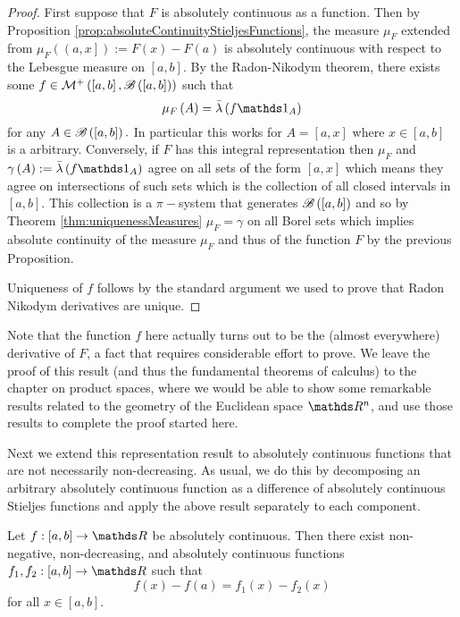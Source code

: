 \begin{proof}
First suppose that $F$ is absolutely continuous as a function. Then
by Proposition \ref{prop:absoluteContinuityStieljesFunctions}, the
measure $\mu_{F}$ extended from $\mu_{F}\left(\left(a,x\right]\right):=F\left(x\right)-F\left(a\right)$
is absolutely continuous with respect to the Lebesgue measure on $\left[a,b\right].$
By the Radon-Nikodym theorem, there exists some $f\in\mathcal{M}^{+}\left(\left[a,b\right],\mathscr{B}\left(\left[a,b\right]\right)\right)$
such that
\[
\mu_{F}\left(A\right)=\lebInt{\lambda}{f\indicate_{A}}
\]
for any $A\in\mathscr{B}\left(\left[a,b\right]\right).$ In particular
this works for $A=\left[a,x\right]$ where $x\in\left[a,b\right]$
is a arbitrary. Conversely, if $F$ has this integral representation
then $\mu_{F}$ and $\gamma\left(A\right):=\lebInt{\lambda}{f\indicate_{A}}$
agree on all sets of the form $\left[a,x\right]$ which means they
agree on intersections of such sets which is the collection of all
closed intervals in $\left[a,b\right].$ This collection is a $\pi-$system
that generates $\mathscr{B}\left(\left[a,b\right]\right)$ and so by Theorem
\ref{thm:uniquenessMeasures} $\mu_{F}=\gamma$ on all Borel sets
which implies absolute continuity of the measure $\mu_{F}$ and thus
of the function $F$ by the previous Proposition.

Uniqueness of $f$ follows by the standard argument we used to prove
that Radon Nikodym derivatives are unique.
\end{proof}
\begin{rem*}
Note that the function $f$ here actually turns out to be the (almost
everywhere) derivative of $F$, a fact that requires considerable
effort to prove. We leave the proof of this result (and thus the fundamental
theorems of calculus) to the chapter on product spaces, where we would
be able to show some remarkable results related to the geometry of
the Euclidean space $\R^{n}$, and use those results to complete the
proof started here.
\end{rem*}
Next we extend this representation result to absolutely continuous
functions that are not necessarily non-decreasing. As usual, we do
this by decomposing an arbitrary absolutely continuous function as
a difference of absolutely continuous Stieljes functions and apply
the above result separately to each component.
\begin{lem}
\label{lem:decomposeAbsolutelyContinuous}Let $f:\left[a,b\right]\to\R$
be absolutely continuous. Then there exist non-negative, non-decreasing,
and absolutely continuous functions $f_{1},f_{2}:\left[a,b\right]\to\R$
such that 
\[
f\left(x\right)-f\left(a\right)=f_{1}\left(x\right)-f_{2}\left(x\right)
\]
for all $x\in\left[a,b\right]$.
\end{lem}

